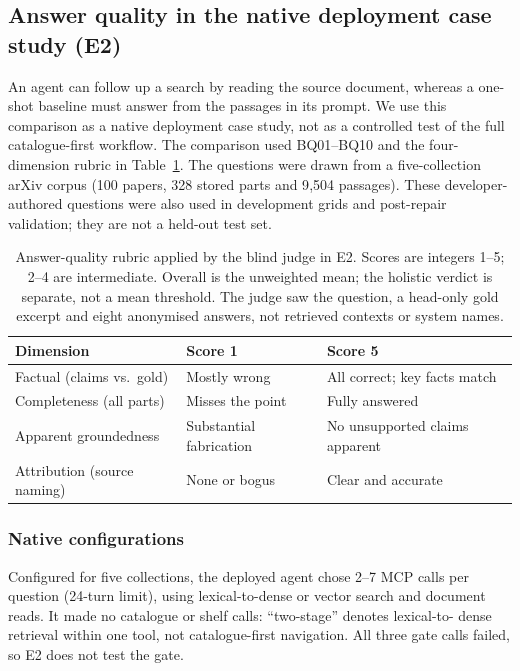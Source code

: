 \subsection{Answer quality in the native deployment case study (E2)}
\label{sec:e10}
\label{sec:external-baselines}
\label{sec:exp-e2}
An agent can follow up a search by reading the source document, whereas a
one-shot baseline must answer from the passages in its prompt. We use this
comparison as a native deployment case study, not as a controlled test of the
full catalogue-first workflow. The comparison used BQ01--BQ10 and the
four-dimension rubric in Table~\ref{tab:rubric}. The questions were
drawn from a five-collection
arXiv corpus (100 papers, 328 stored parts and 9{,}504 passages). These
developer-authored questions were also used in development grids and
post-repair validation; they are not a held-out test set.

\begin{table}[!tb]
\centering
\scriptsize
\setlength{\tabcolsep}{2.5pt}
\renewcommand{\arraystretch}{1.03}
\caption{Answer-quality rubric applied by the blind judge in E2. Scores are
integers 1--5; 2--4 are intermediate. Overall is the unweighted mean; the
holistic verdict is separate, not a mean threshold. The judge saw the
question, a head-only gold excerpt and eight anonymised answers, not
retrieved contexts or system names.}
\label{tab:rubric}
\begin{tabular}{@{}>{\raggedright\arraybackslash}p{}>{\raggedright\arraybackslash}p{}>{\raggedright\arraybackslash}p{}@{}}
\toprule
Dimension & Score 1 & Score 5\\
\midrule
Factual (claims vs.\ gold) & Mostly wrong & All correct; key facts match\\
Completeness (all parts) & Misses the point & Fully answered\\
Apparent groundedness & Substantial fabrication & No unsupported claims apparent\\
Attribution (source naming) & None or bogus & Clear and accurate\\
\bottomrule
\end{tabular}
\end{table}

\subsubsection{Native configurations}
Configured for five collections, the deployed agent chose 2--7 MCP calls per
question (24-turn limit), using lexical-to-dense or vector search and document
reads. It made no catalogue or shelf calls: ``two-stage'' denotes lexical-to-
dense retrieval within one tool, not catalogue-first navigation. All three
gate calls failed, so E2 does not test the gate.

